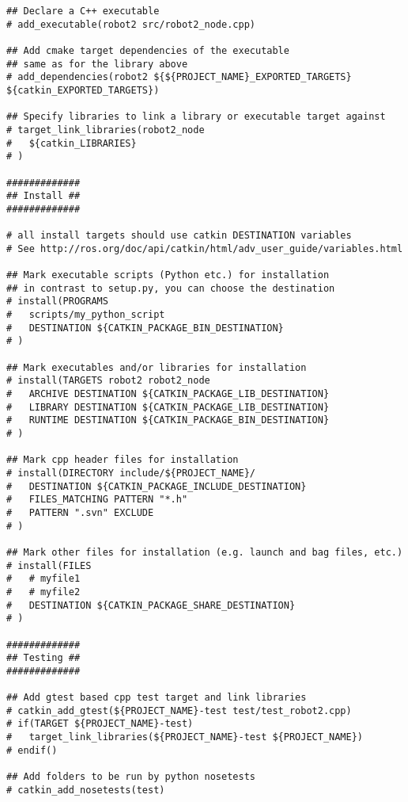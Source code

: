 \begin{lstlisting}
## Declare a C++ executable
# add_executable(robot2 src/robot2_node.cpp)

## Add cmake target dependencies of the executable
## same as for the library above
# add_dependencies(robot2 ${${PROJECT_NAME}_EXPORTED_TARGETS} ${catkin_EXPORTED_TARGETS})

## Specify libraries to link a library or executable target against
# target_link_libraries(robot2_node
#   ${catkin_LIBRARIES}
# )

#############
## Install ##
#############

# all install targets should use catkin DESTINATION variables
# See http://ros.org/doc/api/catkin/html/adv_user_guide/variables.html

## Mark executable scripts (Python etc.) for installation
## in contrast to setup.py, you can choose the destination
# install(PROGRAMS
#   scripts/my_python_script
#   DESTINATION ${CATKIN_PACKAGE_BIN_DESTINATION}
# )

## Mark executables and/or libraries for installation
# install(TARGETS robot2 robot2_node
#   ARCHIVE DESTINATION ${CATKIN_PACKAGE_LIB_DESTINATION}
#   LIBRARY DESTINATION ${CATKIN_PACKAGE_LIB_DESTINATION}
#   RUNTIME DESTINATION ${CATKIN_PACKAGE_BIN_DESTINATION}
# )

## Mark cpp header files for installation
# install(DIRECTORY include/${PROJECT_NAME}/
#   DESTINATION ${CATKIN_PACKAGE_INCLUDE_DESTINATION}
#   FILES_MATCHING PATTERN "*.h"
#   PATTERN ".svn" EXCLUDE
# )

## Mark other files for installation (e.g. launch and bag files, etc.)
# install(FILES
#   # myfile1
#   # myfile2
#   DESTINATION ${CATKIN_PACKAGE_SHARE_DESTINATION}
# )

#############
## Testing ##
#############

## Add gtest based cpp test target and link libraries
# catkin_add_gtest(${PROJECT_NAME}-test test/test_robot2.cpp)
# if(TARGET ${PROJECT_NAME}-test)
#   target_link_libraries(${PROJECT_NAME}-test ${PROJECT_NAME})
# endif()

## Add folders to be run by python nosetests
# catkin_add_nosetests(test)
\end{lstlisting}
